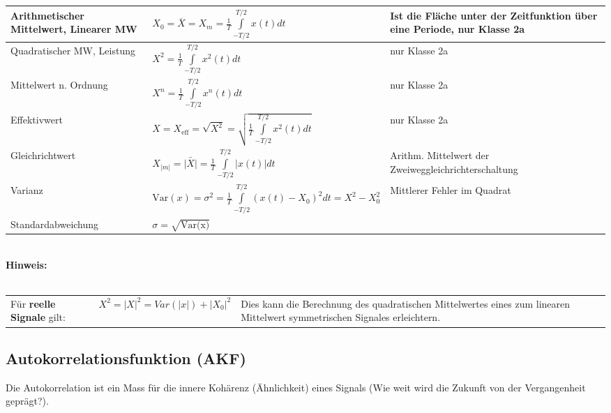 		\begin{tabularx}{\textwidth}{|p{4.7cm}|p{8.1cm}|X|}
			\hline
			Arithmetischer Mittelwert, Linearer MW
		&	$X_0 = \overline{X} = X_m = \frac {1} {T} \int\limits_{-T/2}^{T/2} x(t)dt$
		&	Ist die Fläche unter der Zeitfunktion über eine Periode, nur Klasse 2a
		\\
		\hline
			Quadratischer MW, Leistung
		&	$X^2 = \frac {1} {T} \int\limits_{-T/2}^{T/2} x^2(t)dt$
		& 	nur Klasse 2a
		\\
		\hline
			Mittelwert n. Ordnung
		&	$X^n = \frac {1} {T} \int\limits_{-T/2}^{T/2} x^n(t)dt$
		& 	nur Klasse 2a
		\\
		\hline
			Effektivwert
		&	$X = X_{\text{eff}}= \sqrt{X^2} = \sqrt{\frac{1}{T} \int\limits_{-T/2}^{T/2}{x^2(t)dt}}$
		&	nur Klasse 2a
		\\
		\hline
			Gleichrichtwert
		&	$X_{|m|} = \bar{|X|} = \frac{1}{T} \int\limits_{-T/2}^{T/2}{|x(t)| dt}$
		&	Arithm. Mittelwert der Zweiweggleichrichterschaltung
	    \\
	    \hline
			Varianz
		&	$\text{Var}(x)=\sigma^2= \frac {1} {T} \int\limits_{-T/2}^{T/2}(x(t)-X_0)^2dt = X^2-X_0^2$
		&	Mittlerer Fehler im Quadrat
		\\
		\hline
		Standardabweichung
		&	$\sigma = \sqrt{\text{Var(x)}}$
		&	{}
		\\
		\hline
		\end{tabularx} \\
	
		\textbf{Hinweis:} \\
		\\
		\begin{tabularx}{\textwidth}{llX}
			Für \textbf{reelle Signale} gilt: &
			$ X^2 = |X|^2 = Var(|x|) + |X_0|^2 $ &
			Dies kann die Berechnung des quadratischen Mittelwertes eines zum linearen Mittelwert symmetrischen Signales erleichtern.
		\end{tabularx}
		
		
	\subsection{Autokorrelationsfunktion (AKF) } 
	Die Autokorrelation ist ein Mass für die innere Kohärenz (Ähnlichkeit) eines Signals (Wie weit wird die Zukunft von der Vergangenheit geprägt?).
	
